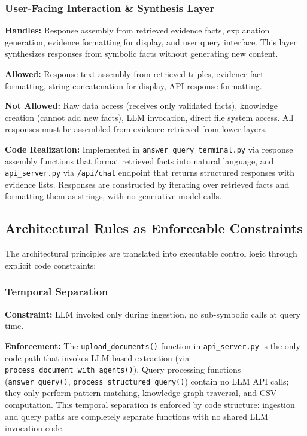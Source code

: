 \subsubsection{User-Facing Interaction \& Synthesis Layer}

\textbf{Handles:} Response assembly from retrieved evidence facts, explanation generation, evidence formatting for display, and user query interface. This layer synthesizes responses from symbolic facts without generating new content.

\textbf{Allowed:} Response text assembly from retrieved triples, evidence fact formatting, string concatenation for display, API response formatting.

\textbf{Not Allowed:} Raw data access (receives only validated facts), knowledge creation (cannot add new facts), LLM invocation, direct file system access. All responses must be assembled from evidence retrieved from lower layers.

\textbf{Code Realization:} Implemented in \texttt{answer\_query\_terminal.py} via response assembly functions that format retrieved facts into natural language, and \texttt{api\_server.py} via \texttt{/api/chat} endpoint that returns structured responses with evidence lists. Responses are constructed by iterating over retrieved facts and formatting them as strings, with no generative model calls.

\subsection{Architectural Rules as Enforceable Constraints}

The architectural principles are translated into executable control logic through explicit code constraints:

\subsubsection{Temporal Separation}

\textbf{Constraint:} LLM invoked only during ingestion, no sub-symbolic calls at query time.

\textbf{Enforcement:} The \texttt{upload\_documents()} function in \texttt{api\_server.py} is the only code path that invokes LLM-based extraction (via \texttt{process\_document\_with\_agents()}). Query processing functions (\texttt{answer\_query()}, \texttt{process\_structured\_query()}) contain no LLM API calls; they only perform pattern matching, knowledge graph traversal, and CSV computation. This temporal separation is enforced by code structure: ingestion and query paths are completely separate functions with no shared LLM invocation code.

